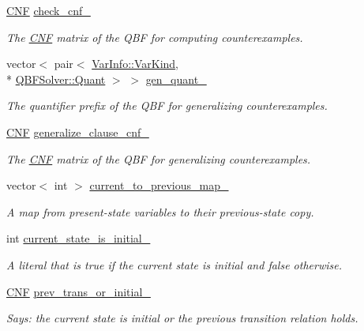 \begin{DoxyCompactItemize}
\hyperlink{classCNF}{C\-N\-F} \hyperlink{classLearnSynthQBFInd_ac90a4574da82c96888db219291368554}{check\-\_\-cnf\-\_\-}
\begin{DoxyCompactList}\small\item\em The \hyperlink{classCNF}{C\-N\-F} matrix of the Q\-B\-F for computing counterexamples. \end{DoxyCompactList}\item 
vector$<$ pair$<$ \hyperlink{classVarInfo_a64d1da76cf84fe674e5fef9764ef11cf}{Var\-Info\-::\-Var\-Kind}, \\*
\hyperlink{classQBFSolver_ac091e263cb55286cc07b2451bcf4d3c7}{Q\-B\-F\-Solver\-::\-Quant} $>$ $>$ \hyperlink{classLearnSynthQBFInd_a1a20b68cc735e4bbc0cc7030329acb4d}{gen\-\_\-quant\-\_\-}
\begin{DoxyCompactList}\small\item\em The quantifier prefix of the Q\-B\-F for generalizing counterexamples. \end{DoxyCompactList}\item 
\hyperlink{classCNF}{C\-N\-F} \hyperlink{classLearnSynthQBFInd_ad61b112cfcc60506f7b21c9ea9267b37}{generalize\-\_\-clause\-\_\-cnf\-\_\-}
\begin{DoxyCompactList}\small\item\em The \hyperlink{classCNF}{C\-N\-F} matrix of the Q\-B\-F for generalizing counterexamples. \end{DoxyCompactList}\item 
vector$<$ int $>$ \hyperlink{classLearnSynthQBFInd_a8047ab13c44736c39c11f9c0b48e29cf}{current\-\_\-to\-\_\-previous\-\_\-map\-\_\-}
\begin{DoxyCompactList}\small\item\em A map from present-\/state variables to their previous-\/state copy. \end{DoxyCompactList}\item 
int \hyperlink{classLearnSynthQBFInd_a36e64e8ac156ca4978e73be5493de782}{current\-\_\-state\-\_\-is\-\_\-initial\-\_\-}
\begin{DoxyCompactList}\small\item\em A literal that is true if the current state is initial and false otherwise. \end{DoxyCompactList}\item 
\hyperlink{classCNF}{C\-N\-F} \hyperlink{classLearnSynthQBFInd_ad99eafb7ee9134115f9fbe986e5eb0c5}{prev\-\_\-trans\-\_\-or\-\_\-initial\-\_\-}
\begin{DoxyCompactList}\small\item\em Says\-: the current state is initial or the previous transition relation holds. \end{DoxyCompactList}\item 

\end{DoxyCompactItemize}
